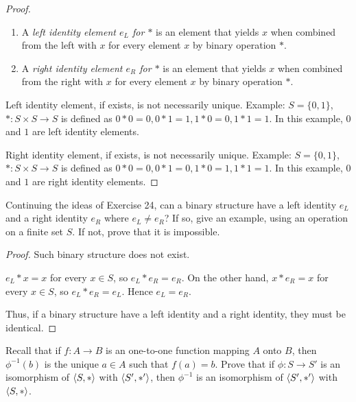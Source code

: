 \begin{proof}
    \begin{enumerate}[label={\textbf{\alph*.}},itemsep=0pt]
        \item A \textit{left identity element $e_{L}$ for $*$} is an element that yields $x$ when combined from the left with $x$ for every element $x$ by binary operation $*$.
        \item A \textit{right identity element $e_{R}$ for $*$} is an element that yields $x$ when combined from the right with $x$ for every element $x$ by binary operation $*$.
    \end{enumerate}

    Left identity element, if exists, is not necessarily unique. Example: $S = \{ 0, 1 \}$, $*: S\times S\to S$ is defined as $0 * 0 = 0, 0 * 1 = 1, 1 * 0 = 0, 1 * 1 = 1$. In this example, $0$ and $1$ are left identity elements.

    Right identity element, if exists, is not necessarily unique. Example: $S = \{ 0, 1 \}$, $*: S\times S\to S$ is defined as $0 * 0 = 0, 0 * 1 = 0, 1 * 0 = 1, 1 * 1 = 1$. In this example, $0$ and $1$ are right identity elements.
\end{proof}

\begin{exercise}
    Continuing the ideas of Exercise 24, can a binary structure have a left identity $e_{L}$ and a right identity $e_{R}$ where $e_{L}\ne e_{R}$? If so, give an example, using an operation on a finite set $S$. If not, prove that it is impossible.
\end{exercise}

\begin{proof}
    Such binary structure does not exist.

    $e_{L} * x = x$ for every $x\in S$, so $e_{L} * e_{R} = e_{R}$. On the other hand, $x * e_{R} = x$ for every $x\in S$, so $e_{L} * e_{R} = e_{L}$. Hence $e_{L} = e_{R}$.

    Thus, if a binary structure have a left identity and a right identity, they must be identical.
\end{proof}

\begin{exercise}
    Recall that if $f: A \to B$ is an one-to-one function mapping $A$ onto $B$, then $\phi^{-1}(b)$ is the unique $a\in A$ such that $f(a) = b$. Prove that if $\phi: S \to S'$ is an isomorphism of $\left\langle{S, *}\right\rangle$ with $\left\langle{S', *'}\right\rangle$, then $\phi^{-1}$ is an isomorphism of $\left\langle{S', *'}\right\rangle$ with $\left\langle{S, *}\right\rangle$.
\end{exercise}

